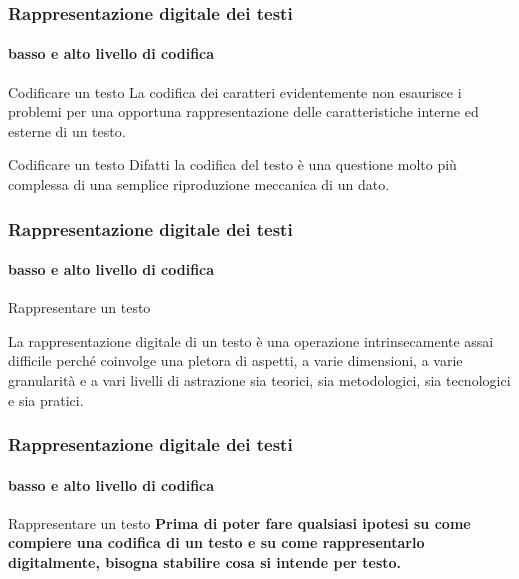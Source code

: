 
\begin{frame}
	\frametitle{Rappresentazione digitale dei testi}
	\framesubtitle{basso e alto livello di codifica}
	\addtocounter{nframe}{1}

	\begin{block}{Codificare un testo}
		La codifica dei caratteri evidentemente non esaurisce i problemi per una opportuna rappresentazione delle caratteristiche interne ed esterne di un testo.
    \end{block}
    
    \begin{block}{Codificare un testo}
		Difatti la codifica del testo è una questione molto più complessa di una semplice riproduzione meccanica di un dato.
	\end{block}


\end{frame}


\begin{frame}
	\frametitle{Rappresentazione digitale dei testi}
	\framesubtitle{basso e alto livello di codifica}
	\addtocounter{nframe}{1}

	\begin{block}{Rappresentare un testo}
		
			La rappresentazione digitale di un testo è una operazione intrinsecamente assai difficile perché coinvolge una pletora di aspetti, a varie dimensioni, a varie granularità e a vari livelli di astrazione sia teorici, sia metodologici, sia tecnologici e sia pratici.
		
	\end{block}

\end{frame}

\begin{frame}
	\frametitle{Rappresentazione digitale dei testi}
	\framesubtitle{basso e alto livello di codifica}
	\addtocounter{nframe}{1}

	\begin{block}{Rappresentare un testo}
		\textbf{
			Prima di poter fare qualsiasi ipotesi su come compiere una codifica di un testo e su come rappresentarlo digitalmente, bisogna stabilire cosa si intende per testo.
		}
	\end{block}

\end{frame}


